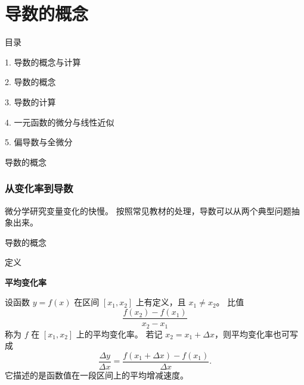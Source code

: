 \documentclass[aspectratio=169,10pt,fontset=fandol]{ctexbeamer}
\begin{document}
\section{导数的概念}
\begin{frame}[t,fragile]{目录}
\normalsize
{\color{black}\normalsize 1. 导数的概念与计算\par}\vspace{0.22em}
{\color{blue}\normalsize 2. 导数的概念\par}\vspace{0.22em}
{\color{gray!40}\normalsize 3. 导数的计算\par}\vspace{0.22em}
{\color{gray!40}\normalsize 4. 一元函数的微分与线性近似\par}\vspace{0.22em}
{\color{gray!40}\normalsize 5. 偏导数与全微分\par}\vspace{0.22em}
\end{frame}
\begin{frame}[t,fragile]{导数的概念}
\normalsize
{\normalsize

\subsubsection*{从变化率到导数}


}
{\normalsize
微分学研究变量变化的快慢。 按照常见教材的处理，导数可以从两个典型问题抽象出来。


}
\end{frame}
\begin{frame}[t,fragile]{导数的概念}
\normalsize
\begin{block}{定义}
{\normalsize
\textbf{平均变化率}\par

设函数 $y=f(x)$ 在区间 $[x_1,x_2]$ 上有定义，且 $x_1\neq x_2$。 比值
\[
\frac{f(x_2)-f(x_1)}{x_2-x_1}
\]
称为 $f$ 在 $[x_1,x_2]$ 上的平均变化率。 若记 $x_2=x_1+\Delta x$，则平均变化率也可写成
\[
\frac{\Delta y}{\Delta x}
=\frac{f(x_1+\Delta x)-f(x_1)}{\Delta x}.
\]
它描述的是函数值在一段区间上的平均增减速度。

}
\end{block}
\end{frame}
\end{document}

